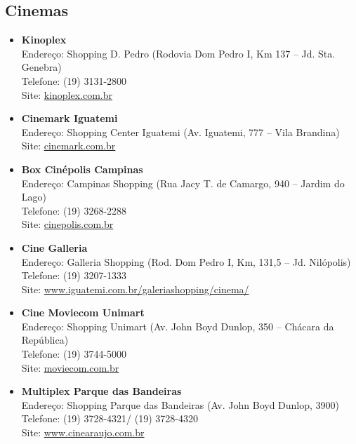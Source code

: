 \subsection{Cinemas}

\begin{itemize}
    \item   \textbf{Kinoplex}
        \\Endereço: Shopping D. Pedro (Rodovia Dom Pedro I, Km 137 -- Jd. Sta. Genebra)
        \\Telefone: (19) 3131-2800
        \\Site: \url{kinoplex.com.br}

    \item   \textbf{Cinemark Iguatemi}
        \\Endereço: Shopping Center Iguatemi (Av. Iguatemi, 777 -- Vila Brandina)
        \\Site: \url{cinemark.com.br}

    \item   \textbf{Box Cinépolis Campinas}
        \\Endereço: Campinas Shopping (Rua Jacy T. de Camargo, 940 -- Jardim do Lago)
        \\Telefone: (19) 3268-2288
        \\Site: \url{cinepolis.com.br}

    \item   \textbf{Cine Galleria}
        \\Endereço: Galleria Shopping (Rod. Dom Pedro I, Km, 131,5 -- Jd. Nilópolis)
        \\Telefone: (19) 3207-1333
        \\Site: \url{www.iguatemi.com.br/galeriashopping/cinema/}

    \item   \textbf{Cine Moviecom Unimart}
        \\Endereço: Shopping Unimart (Av. John Boyd Dunlop, 350 -- Chácara da República)
        \\Telefone: (19) 3744-5000
        \\Site: \url{moviecom.com.br}

    \item   \textbf{Multiplex Parque das Bandeiras}
        \\Endereço: Shopping Parque das Bandeiras (Av. John Boyd Dunlop, 3900)
        \\Telefone: (19) 3728-4321/ (19) 3728-4320
        \\Site: \url{www.cinearaujo.com.br}
		

\end{itemize}
